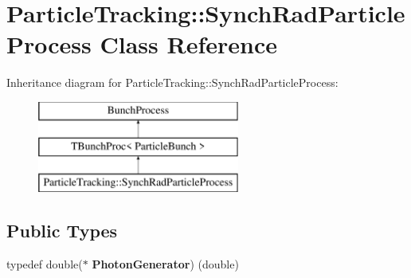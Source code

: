 \hypertarget{classParticleTracking_1_1SynchRadParticleProcess}{}\section{Particle\+Tracking\+:\+:Synch\+Rad\+Particle\+Process Class Reference}
\label{classParticleTracking_1_1SynchRadParticleProcess}
Inheritance diagram for Particle\+Tracking\+:\+:Synch\+Rad\+Particle\+Process\+:\begin{figure}[H]
\begin{center}
\leavevmode
\includegraphics[height=3.000000cm]{classParticleTracking_1_1SynchRadParticleProcess}
\end{center}
\end{figure}
\subsection*{Public Types}
\begin{DoxyCompactItemize}
\item 
\mbox{\label{classParticleTracking_1_1SynchRadParticleProcess_ae8a003f6488a6d41dd87c7fec6cb815e}} 
typedef double($\ast$ {\bfseries Photon\+Generator}) (double)
\end{DoxyCompactItemize}
